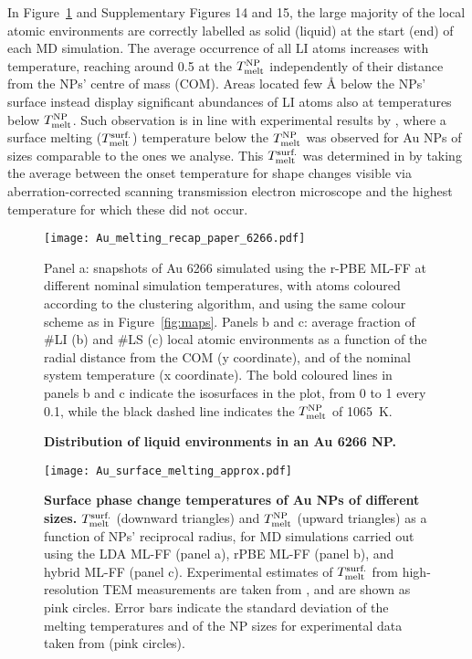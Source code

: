 \documentclass[%
aip,
 amsmath,amssymb,
 reprint,
]{revtex4-1}
\newcommand*\subt[1]{_{\textnormal{#1}}}
\newcommand*\supt[1]{^{\textnormal{#1}}}
\begin{document}
In Figure~\ref{fig:cluster_heatmap} {and Supplementary Figures 14 and 15}, the large majority of the local atomic environments are correctly labelled as solid (liquid) at the start (end) of each MD simulation.
%
The average occurrence of all LI atoms increases with temperature, reaching around 0.5 at the $T\subt{melt}\supt{NP}$ independently of their distance from the NPs' centre of mass (COM).
%
Areas located few $\text{\AA}$ below the NPs' surface instead display significant abundances of LI atoms also at temperatures below $T\subt{melt}\supt{NP}$.
%
Such observation is in line with experimental results by \citet{Foster2019}, where a surface melting ($T\subt{melt}\supt{surf.}$) temperature below the $T\subt{melt}\supt{NP}$ was observed for Au NPs of sizes comparable to the ones we analyse.
%
This $T\subt{melt}\supt{surf.}$ was determined in \citet{Foster2019} by taking the average between the onset temperature for shape changes visible via aberration-corrected scanning transmission electron microscope and the highest temperature for which these did not occur.

%
\begin{figure}[t!]
    \centering
    \texttt{[image: Au\_melting\_recap\_paper\_6266.pdf]}
    \caption{
    \textbf{Distribution of liquid environments in an Au 6266 NP.}}
    Panel a: snapshots of Au 6266 simulated using the r-PBE ML-FF at different nominal simulation temperatures, with atoms coloured according to the clustering algorithm, and using the same colour scheme as in Figure~\ref{fig:maps}.
    Panels b and c: average fraction of \#LI (b) and \#LS (c) local atomic environments as a function of the radial distance from the COM (y coordinate), and of the nominal system temperature (x coordinate).
    The bold coloured lines in panels b and c indicate the isosurfaces in the plot, from 0 to 1 every 0.1, while the black dashed line indicates the $T\subt{melt}\supt{NP}$ of 1065~K.
    \label{fig:cluster_heatmap}
\end{figure}
%

\begin{figure}[t!]
    \centering
    \texttt{[image: Au\_surface\_melting\_approx.pdf]}
    \caption{
    \textbf{Surface phase change temperatures of Au NPs of different sizes.}
    $T\supt{surf.}\subt{melt}$  (downward triangles) and $T\subt{melt}\supt{NP}$ (upward triangles) as a function of NPs' reciprocal radius, for MD simulations carried out using the LDA ML-FF (panel a), rPBE ML-FF (panel b), and hybrid ML-FF (panel c).
    Experimental estimates of $T\supt{surf.}\subt{melt}$  from high-resolution TEM measurements are taken from \citet{Foster2019}, and are shown as pink circles.
    Error bars indicate the standard deviation of the melting temperatures and of the NP sizes for experimental data taken from \citet{Foster2019} (pink circles).}
    \label{fig:tmeltsurf}
\end{figure}
\end{document}
